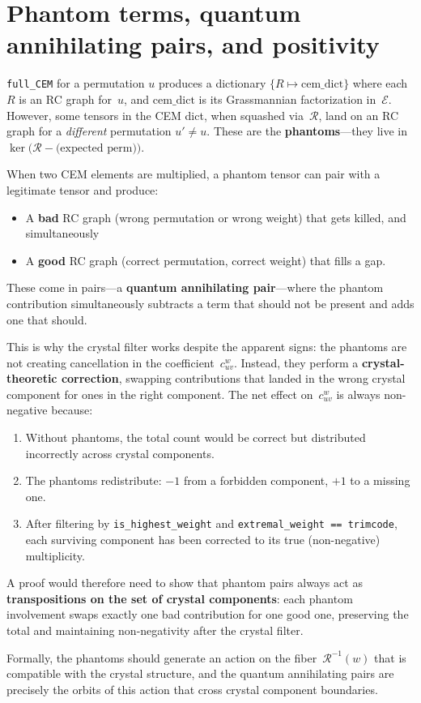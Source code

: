 \documentclass[11pt]{article}
\newcommand{\CE}{\mathcal{E}}
\newcommand{\CR}{\mathcal{R}}
\begin{document}
\section*{Phantom terms, quantum annihilating pairs, and positivity}

\texttt{full\_CEM} for a permutation $u$ produces a dictionary
$\{R \mapsto \text{cem\_dict}\}$ where each $R$ is an RC graph for~$u$,
and $\text{cem\_dict}$ is its Grassmannian factorization in~$\CE$.
However, some tensors in the CEM dict, when squashed via~$\CR$, land on
an RC graph for a \emph{different} permutation $u' \neq u$.  These are
the \textbf{phantoms}---they live in
$\ker\!\bigl(\CR - \text{(expected perm)}\bigr)$.

When two CEM elements are multiplied, a phantom tensor can pair with a
legitimate tensor and produce:
\begin{itemize}
  \item A \textbf{bad} RC graph (wrong permutation or wrong weight) that
        gets killed, and simultaneously
  \item A \textbf{good} RC graph (correct permutation, correct weight)
        that fills a gap.
\end{itemize}
These come in pairs---a \textbf{quantum annihilating pair}---where the
phantom contribution simultaneously subtracts a term that should not be
present and adds one that should.

This is why the crystal filter works despite the apparent signs: the
phantoms are not creating cancellation in the coefficient~$c_{uv}^w$.
Instead, they perform a \textbf{crystal-theoretic correction}, swapping
contributions that landed in the wrong crystal component for ones in the
right component.  The net effect on~$c_{uv}^w$ is always non-negative
because:
\begin{enumerate}
  \item Without phantoms, the total count would be correct but
        distributed incorrectly across crystal components.
  \item The phantoms redistribute: $-1$ from a forbidden component,
        $+1$ to a missing one.
  \item After filtering by \texttt{is\_highest\_weight} and
        \texttt{extremal\_weight == trimcode}, each surviving component
        has been corrected to its true (non-negative) multiplicity.
\end{enumerate}

A proof would therefore need to show that phantom pairs always act as
\textbf{transpositions on the set of crystal components}: each phantom
involvement swaps exactly one bad contribution for one good one,
preserving the total and maintaining non-negativity after the crystal
filter.

Formally, the phantoms should generate an action on the
fiber~$\CR^{-1}(w)$ that is compatible with the crystal structure, and
the quantum annihilating pairs are precisely the orbits of this action
that cross crystal component boundaries.
\end{document}
